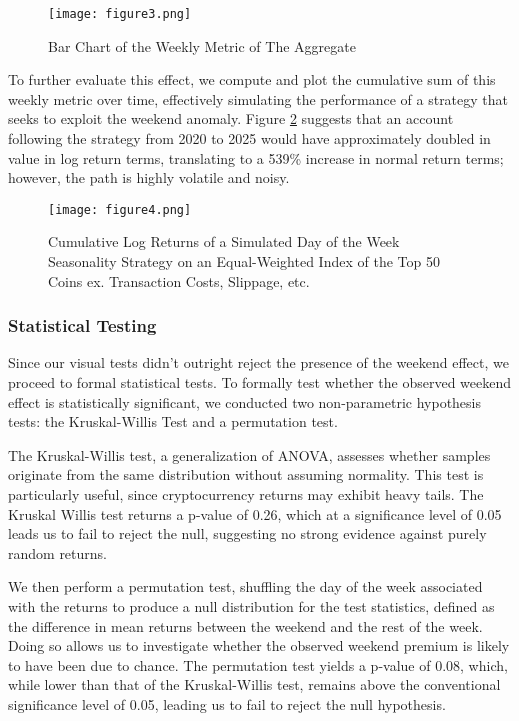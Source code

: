 \documentclass[
]{article}
\begin{document}
\begin{figure}
    \centering
    \texttt{[image: figure3.png]}
    \caption{Bar Chart of the Weekly Metric of The Aggregate}
    \label{fig:3}
\end{figure}

To further evaluate this effect, we compute and plot the cumulative sum
of this weekly metric over time, effectively simulating the performance
of a strategy that seeks to exploit the weekend anomaly. Figure
\textcolor{blue}{\ref{fig:4}} suggests that an account following the
strategy from 2020 to 2025 would have approximately doubled in value in
log return terms, translating to a 539\% increase in normal return
terms; however, the path is highly volatile and noisy.

\begin{figure}
    \centering
    \texttt{[image: figure4.png]}
    \caption{Cumulative Log Returns of a Simulated Day of the Week Seasonality Strategy on an Equal-Weighted Index of the Top 50 Coins ex. Transaction Costs, Slippage, etc.}
    \label{fig:4}
\end{figure}

\subsubsection{Statistical Testing}\label{statistical-testing}

Since our visual tests didn't outright reject the presence of the
weekend effect, we proceed to formal statistical tests. To formally test
whether the observed weekend effect is statistically significant, we
conducted two non-parametric hypothesis tests: the Kruskal-Willis Test
and a permutation test.

The Kruskal-Willis test, a generalization of ANOVA, assesses whether
samples originate from the same distribution without assuming normality.
This test is particularly useful, since cryptocurrency returns may
exhibit heavy tails. The Kruskal Willis test returns a p-value of 0.26,
which at a significance level of 0.05 leads us to fail to reject the
null, suggesting no strong evidence against purely random returns.

We then perform a permutation test, shuffling the day of the week
associated with the returns to produce a null distribution for the test
statistics, defined as the difference in mean returns between the
weekend and the rest of the week. Doing so allows us to investigate
whether the observed weekend premium is likely to have been due to
chance. The permutation test yields a p-value of 0.08, which, while
lower than that of the Kruskal-Willis test, remains above the
conventional significance level of 0.05, leading us to fail to reject
the null hypothesis.
\end{document}
